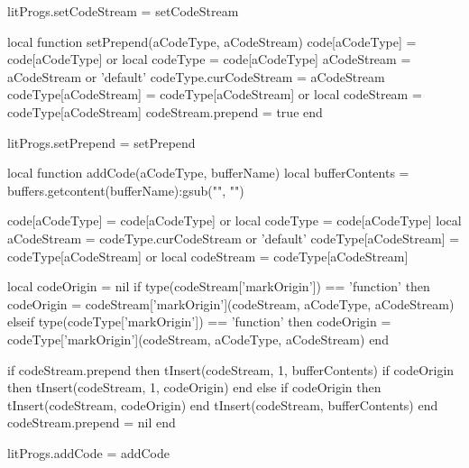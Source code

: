 litProgs.setCodeStream = setCodeStream

local function setPrepend(aCodeType, aCodeStream)
  code[aCodeType]        = code[aCodeType] or { }
  local codeType         = code[aCodeType]
  aCodeStream            = aCodeStream or 'default'
  codeType.curCodeStream = aCodeStream
  codeType[aCodeStream]  = codeType[aCodeStream] or { }
  local codeStream       = codeType[aCodeStream]
  codeStream.prepend     = true
end

litProgs.setPrepend = setPrepend

local function addCode(aCodeType, bufferName)
  local bufferContents  =
    buffers.getcontent(bufferName):gsub("", "\n")

  code[aCodeType]       = code[aCodeType] or { }
  local codeType        = code[aCodeType]
  local aCodeStream     = codeType.curCodeStream or 'default'
  codeType[aCodeStream] = codeType[aCodeStream] or { }
  local codeStream      = codeType[aCodeStream]

  local codeOrigin      = nil
    if type(codeStream['markOrigin']) == 'function' then
      codeOrigin =
        codeStream['markOrigin'](codeStream, aCodeType, aCodeStream)
    elseif type(codeType['markOrigin']) == 'function' then
      codeOrigin =
        codeType['markOrigin'](codeStream, aCodeType, aCodeStream)
    end

  if codeStream.prepend then
    tInsert(codeStream, 1, bufferContents)
    if codeOrigin then 
      tInsert(codeStream, 1, codeOrigin)
    end
  else
    if codeOrigin then
      tInsert(codeStream, codeOrigin)
    end
    tInsert(codeStream, bufferContents)
  end
  codeStream.prepend = nil
end

litProgs.addCode = addCode
\stopLuaCode

\startMkIVCode
\unexpanded\def\setLitProgsOriginMarker{%
  \dotripleempty\doSetLitProgsOriginMarker%
}

\unexpanded{}
\stopMkIVCode

